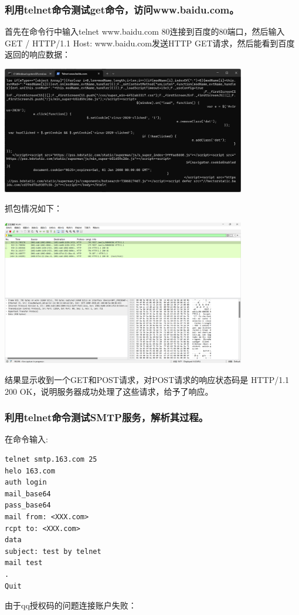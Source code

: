 \documentclass{article}
\begin{document}
\subsubsection{利用telnet命令测试get命令，访问www.baidu.com。}
首先在命令行中输入telnet www.baidu.com 80连接到百度的80端口，然后输入GET / HTTP/1.1		Host: www.baidu.com发送HTTP GET请求，然后能看到百度返回的响应数据： 

\vspace{10pt}
\centerline{\includegraphics[width=0.8\textwidth]{1_1_images/14.png}}
\vspace{10pt}
抓包情况如下：

\vspace{10pt}
\centerline{\includegraphics[width=0.8\textwidth]{1_1_images/15.png}}
\vspace{10pt}
结果显示收到一个GET和POST请求，对POST请求的响应状态码是 HTTP/1.1 200 OK，说明服务器成功处理了这些请求，给予了响应。

\subsubsection{利用telnet命令测试SMTP服务，解析其过程。}
在命令输入:
\begin{lstlisting}
telnet smtp.163.com 25
helo 163.com
auth login
mail_base64
pass_base64
mail from: <XXX.com>
rcpt to: <XXX.com>
data
subject: test by telnet
mail test
.
Quit
\end{lstlisting}
由于qq授权码的问题连接账户失败：
\end{document}
